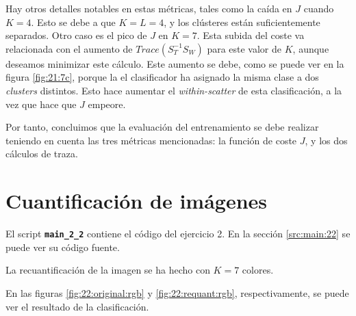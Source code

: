 \documentclass[11pt]{article} %
\begin{document}
Hay otros detalles notables en estas métricas, tales como la caída en $J$ cuando
$K=4$. Esto se debe a que $K = L = 4$, y los clústeres están suficientemente
separados. Otro caso es el pico de $J$ en $K=7$. Esta subida del coste va
relacionada con el aumento de $Trace \left( S_T^{-1} S_W \right)$ para este
valor de $K$, aunque deseamos minimizar este cálculo. Este aumento se debe, como
se puede ver en la figura \ref{fig:21:7c}, porque la el clasificador ha
asignado la misma clase a dos \emph{clusters} distintos. Esto hace aumentar el
\emph{within-scatter} de esta clasificación, a la vez que hace que $J$ empeore.

Por tanto, concluimos que la evaluación del entrenamiento se debe realizar
teniendo en cuenta las tres métricas mencionadas: la función de coste $J$, y los
dos cálculos de traza.



\clearpage

\section{Cuantificación de imágenes}

El script \textbf{\texttt{main\_2\_2}} contiene el código del ejercicio 2. En la
sección \ref{src:main:22} se puede ver su código fuente.

La recuantificación de la imagen se ha hecho con $K=7$ colores.

En las figuras \ref{fig:22:original:rgb} y \ref{fig:22:requant:rgb},
respectivamente, se puede ver el resultado de la clasificación.
\end{document}
